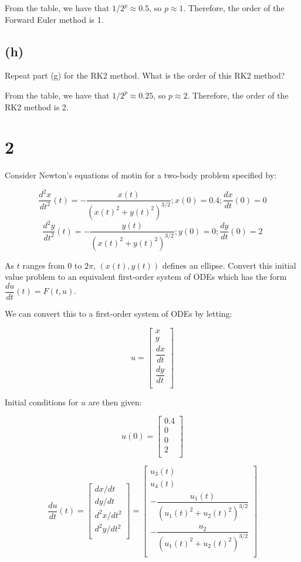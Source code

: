 \documentclass[11pt]{article}
\begin{document}
From the table, we have that $1/2^p \approx 0.5$, so $p \approx 1$. Therefore, the order of the Forward Euler method is 1.

\subsection{(h)}

Repeat part (g) for the RK2 method. What is the order of this RK2 method?

From the table, we have that $1/2^p \approx 0.25$, so $p \approx 2$. Therefore, the order of the RK2 method is 2.

\section{2}

Consider Newton's equations of motin for a two-body problem specified by:

\[ \dfrac{d^2x}{dt^2} (t) = - \dfrac{x(t)}{(x(t)^2 + y(t)^2)^{3/2}} ; x(0) = 0.4; \dfrac{dx}{dt}(0) = 0 \]
\[ \dfrac{d^2y}{dt^2} (t) = - \dfrac{y(t)}{(x(t)^2 + y(t)^2)^{3/2}} ; y(0) = 0; \dfrac{dy}{dt}(0) = 2 \]

As $t$ ranges from $0$ to $2\pi$, $(x(t), y(t))$ defines an ellipse. Convert this initial value problem to an equivalent first-order system of ODEs which has the form $\dfrac{du}{dt}(t) = F(t, u)$.

We can convert this to a first-order system of ODEs by letting:

\[ u = \begin{bmatrix} x \\ y \\ \dfrac{dx}{dt} \\ \dfrac{dy}{dt} \\ \end{bmatrix} \]

Initial conditions for $u$ are then given:

\[ u(0) = \begin{bmatrix} 0.4 \\ 0 \\ 0 \\ 2 \\ \end{bmatrix} \]

\[
  \dfrac{du}{dt}(t) =
  \begin{bmatrix}
    dx/dt \\
    dy/dt \\
    d^2x/dt^2 \\
    d^2y/dt^2 \\
  \end{bmatrix}
  =
  \begin{bmatrix}
    u_3(t) \\
    u_4(t) \\
    - \dfrac{u_1(t)}{(u_1(t)^2 + u_2(t)^2)^{3/2}} \\
    - \dfrac{u_2}{(u_1(t)^2 + u_2(t)^2)^{3/2}} \\
  \end{bmatrix}
\]
\end{document}
